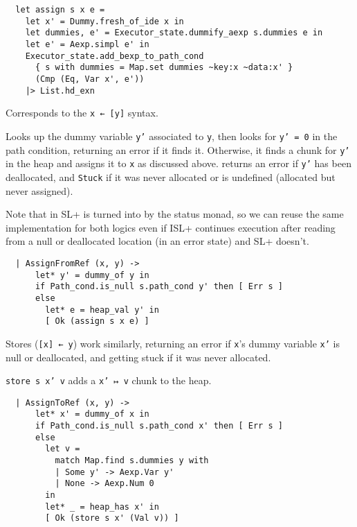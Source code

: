 \documentclass[parskip=half]{scrartcl}
\begin{document}
\begin{verbatim}
  let assign s x e =
    let x' = Dummy.fresh_of_ide x in
    let dummies, e' = Executor_state.dummify_aexp s.dummies e in
    let e' = Aexp.simpl e' in
    Executor_state.add_bexp_to_path_cond
      { s with dummies = Map.set dummies ~key:x ~data:x' }
      (Cmp (Eq, Var x', e'))
    |> List.hd_exn
\end{verbatim}


Corresponds to the \texttt{x ← [y]} syntax.

Looks up the dummy variable \texttt{y'} associated to \texttt{y}, then looks for \texttt{y' = 0} in the path condition, returning an error if it finds it. Otherwise, it finds a chunk for \texttt{y'} in the heap and assigns it to \texttt{x} as discussed above.  returns an error if \texttt{y'} has been deallocated, and \texttt{Stuck} if it was never allocated or is undefined (allocated but never assigned).

Note that in SL+  is turned into  by the status monad, so we can reuse the same implementation for both logics even if ISL+ continues execution after reading from a null or deallocated location (in an error state) and SL+ doesn't.

\begin{verbatim}
  | AssignFromRef (x, y) ->
      let* y' = dummy_of y in
      if Path_cond.is_null s.path_cond y' then [ Err s ]
      else
        let* e = heap_val y' in
        [ Ok (assign s x e) ]
\end{verbatim}


Stores (\texttt{[x] ← y}) work similarly, returning an error if \texttt{x}'s dummy variable \texttt{x'} is null or deallocated, and getting stuck if it was never allocated.

\texttt{store s x' v} adds a \texttt{x' ↦ v} chunk to the heap.

\begin{verbatim}
  | AssignToRef (x, y) ->
      let* x' = dummy_of x in
      if Path_cond.is_null s.path_cond x' then [ Err s ]
      else
        let v =
          match Map.find s.dummies y with
          | Some y' -> Aexp.Var y'
          | None -> Aexp.Num 0
        in
        let* _ = heap_has x' in
        [ Ok (store s x' (Val v)) ]
\end{verbatim}

\end{document}
